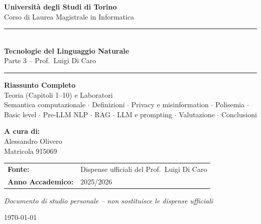 \documentclass[12pt,a4paper]{article}
\newcommand{\HRule}{\rule{\linewidth}{0.5mm}}
\begin{document}
\raggedbottom

\begin{titlepage}
  \centering
  \vspace*{1.5cm}

  {\Large\textbf{Universit\`a degli Studi di Torino}\\[0.3em]
  Corso di Laurea Magistrale in Informatica}

  \vspace{1cm}
  \HRule\\[0.4em]
  {\LARGE\textbf{Tecnologie del Linguaggio Naturale}}\\[0.3em]
  {\large Parte 3 -- Prof.\ Luigi Di Caro}\\[0.2em]
  \HRule

  \vspace{1.2cm}
  {\huge\textbf{Riassunto Completo}}\\[0.5em]
  {\LARGE Teoria (Capitoli 1--10) e Laboratori}\\[0.6em]
  {\large Semantica computazionale \(\cdot\) Definizioni \(\cdot\) Privacy e misinformation \(\cdot\) Polisemia \(\cdot\)\\
  Basic level \(\cdot\) Pre-LLM NLP \(\cdot\) RAG \(\cdot\) LLM e prompting \(\cdot\) Valutazione \(\cdot\) Conclusioni}

  \vspace{1.8cm}
  {\large\textbf{A cura di:}}\\[0.5em]
  {\large Alessandro Olivero}\\[0.3em]
  {\small Matricola 915069}

  \vspace{1.5cm}
  \begin{tabular}{ll}
    \textbf{Fonte:}            & Dispense ufficiali del Prof.\ Luigi Di Caro \\[0.3em]
    \textbf{Anno Accademico:}  & 2025/2026 \\
  \end{tabular}

  \vspace{1cm}
  {\small\itshape Documento di studio personale -- non sostituisce le dispense ufficiali}

  \vfill
  {\large \today}
\end{titlepage}

\tableofcontents
\newpage

\end{document}
